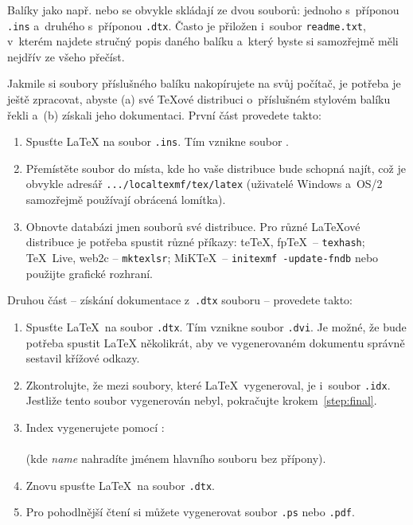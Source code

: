 Balíky jako např.  nebo 
se obvykle skládají ze dvou souborů: jednoho s~příponou
\texttt{.ins} a~druhého s~příponou \texttt{.dtx}. Často
je přiložen i~soubor \texttt{readme.txt}, v~kterém najdete
stručný popis daného balíku a~který byste si samozřejmě
měli nejdřív ze všeho přečíst.

Jakmile si soubory příslušného balíku nakopírujete na svůj počítač,
je potřeba je ještě zpracovat, abyste (a) své \TeX ové
distribuci o~příslušném stylovém balíku řekli a~(b) 
získali jeho dokumentaci. První část provedete takto:

\begin{enumerate}
\item Spusťte \LaTeX{} na soubor \texttt{.ins}. Tím vznikne
  soubor .
\item Přemístěte  soubor do místa, kde ho vaše distribuce
  bude schopná najít, což je obvykle adresář
  \texttt{.../localtexmf/tex/latex} (uživatelé Windows
  a~OS/2 samozřejmě používají obrácená lomítka).
\item Obnovte databázi jmen souborů své distribuce. Pro různé
  \LaTeX ové distribuce je potřeba spustit různé příkazy:
  te\TeX, fp\TeX\ -- \texttt{texhash}; \TeX~Live, web2c -- \texttt{mktexlsr};
  MiK\TeX\ -- \texttt{initexmf -update-fndb} nebo použijte grafické
  rozhraní.
\end{enumerate}

\noindent Druhou část -- získání dokumentace z~\texttt{.dtx} souboru
  -- provedete takto:

\begin{enumerate}
\item Spusťte \LaTeX\ na soubor \texttt{.dtx}. Tím vznikne
  soubor \texttt{.dvi}. Je možné, že bude potřeba spustit \LaTeX{}
  několikrát, aby ve vygenerovaném dokumentu správně sestavil křížové odkazy.
\item Zkontrolujte, že mezi soubory, které \LaTeX\ vygeneroval,
  je i~soubor \texttt{.idx}. Jestliže tento soubor vygenerován nebyl,
  pokračujte krokem~\ref{step:final}.
\item Index vygenerujete pomocí :\\
        \\
        (kde \textit{name} nahradíte jménem hlavního souboru bez přípony).
 \item Znovu spusťte \LaTeX\ na soubor \texttt{.dtx}. \label{step:next}
    
\item Pro pohodlnější čtení si můžete vygenerovat soubor \texttt{.ps}
  nebo \texttt{.pdf}.\label{step:final}
  
\end{enumerate}

